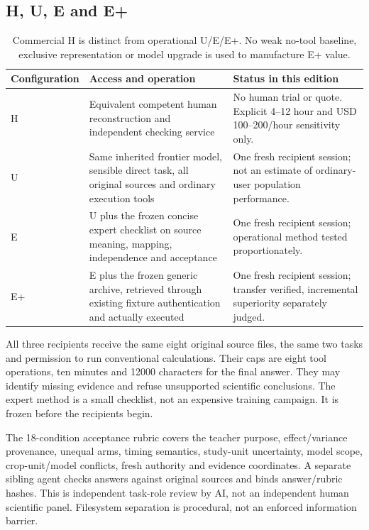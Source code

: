 \documentclass[11pt]{article}
\begin{document}
\subsection{H, U, E and E+}

\begin{table}[htbp]
\small
\begin{tabularx}{\textwidth}{lYY}
\toprule
Configuration & Access and operation & Status in this edition\\
\midrule
H & Equivalent competent human reconstruction and independent checking service & No human trial or quote. Explicit 4–12 hour and USD 100–200/hour sensitivity only.\\
U & Same inherited frontier model, sensible direct task, all original sources and ordinary execution tools & One fresh recipient session; not an estimate of ordinary-user population performance.\\
E & U plus the frozen concise expert checklist on source meaning, mapping, independence and acceptance & One fresh recipient session; operational method tested proportionately.\\
E+ & E plus the frozen generic archive, retrieved through existing fixture authentication and actually executed & One fresh recipient session; transfer verified, incremental superiority separately judged.\\
\bottomrule
\end{tabularx}
\caption{Commercial H is distinct from operational U/E/E+. No weak no-tool baseline, exclusive representation or model upgrade is used to manufacture E+ value.}
\end{table}

All three recipients receive the same eight original source files, the same two tasks and permission to run conventional calculations. Their caps are eight tool operations, ten minutes and 12000 characters for the final answer. They may identify missing evidence and refuse unsupported scientific conclusions. The expert method is a small checklist, not an expensive training campaign. It is frozen before the recipients begin.

The 18-condition acceptance rubric covers the teacher purpose, effect/variance provenance, unequal arms, timing semantics, study-unit uncertainty, model scope, crop-unit/model conflicts, fresh authority and evidence coordinates. A separate sibling agent checks answers against original sources and binds answer/rubric hashes. This is independent task-role review by AI, not an independent human scientific panel. Filesystem separation is procedural, not an enforced information barrier.
\end{document}
